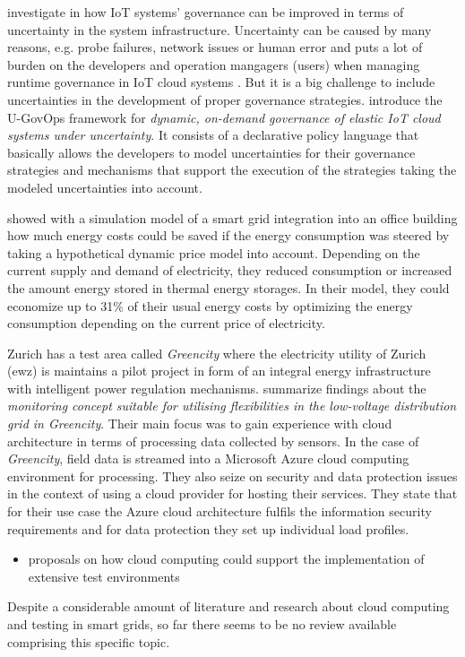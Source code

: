 \citeauthor{7396147} investigate in how IoT systems' governance can be improved in terms of uncertainty in the system infrastructure. Uncertainty can be caused by many reasons, e.g. probe failures, network issues or human error and puts a lot of burden on the developers and operation mangagers (users) when managing runtime governance in IoT cloud systems \cite{7396147}. But it is a big challenge to include uncertainties in the development of proper governance strategies. \citeauthor{7396147} introduce the U-GovOps framework for \textit{dynamic, on-demand governance of elastic IoT cloud systems under uncertainty}. It consists of a declarative policy language that basically allows the developers to model uncertainties for their governance strategies and mechanisms that support the execution of the strategies taking the modeled uncertainties into account.

\citeauthor{bornhoft2013simulation} showed with a simulation model of a smart grid integration into an office building how much energy costs could be saved if the energy consumption was steered by taking a hypothetical dynamic price model into account. Depending on the current supply and demand of electricity, they reduced consumption or increased the amount energy stored in thermal energy storages. In their model, they could economize up to 31\% of their usual energy costs by optimizing the energy consumption depending on the current price of electricity.

Zurich has a test area called \textit{Greencity} where the electricity utility of Zurich (ewz) is maintains a pilot project in form of an integral energy infrastructure with intelligent power regulation mechanisms. \citeauthor{baumgartner2020monitoring} summarize findings about the \textit{monitoring concept suitable for utilising flexibilities in the low-voltage distribution grid in Greencity}. Their main focus was to gain experience with cloud architecture in terms of processing data collected by sensors. In the case of \textit{Greencity}, field data is streamed into a Microsoft Azure cloud computing environment for processing. They also seize on security and data protection issues in the context of using a cloud provider for hosting their services. They state that for their use case the Azure cloud architecture fulfils the information security requirements and for data protection they set up individual load profiles.

\begin{itemize}
\item proposals on how cloud computing could support the implementation of extensive test environments
\end{itemize}

Despite a considerable amount of literature and research about cloud computing and testing in smart grids, so far there seems to be no review available comprising this specific topic.

